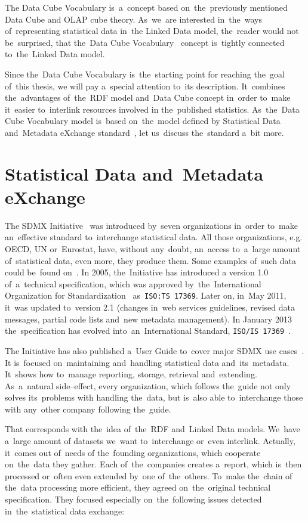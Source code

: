 The Data Cube Vocabulary is~a~concept based on~the~previously mentioned Data Cube and
OLAP cube theory. As~we~are interested in~the~ways of~representing statistical data in~the
Linked Data model, the~reader would not be~surprised, that the~Data Cube 
Vocabulary~\cite{dcv}
concept is~tightly connected to~the~Linked Data model.

Since the~Data Cube Vocabulary is~the~starting point for reaching the~goal of~this thesis,
we will pay a~special attention to~its description. It~combines the~advantages of~the~RDF
model and~Data Cube concept in~order to~make it~easier to~interlink resources involved
in the~published statistics. As~the~Data Cube Vocabulary model is~based on~the~model defined
by Statistical Data and~Metadata eXchange standard~\cite{sdmx}, let us~discuss the~standard a~bit more.

\section{Statistical Data and~Metadata eXchange}
The SDMX Initiative~\cite{sdmx} was introduced by~seven organizations in~order to~make
an~effective standard to~interchange statistical data. All those organizations, e.g. OECD,
UN or~Eurostat, have, without any~doubt, an~access to~a~large amount of~statistical data, even more,
they produce them. Some examples of~such data could be~found on~\cite{pubdata}.
In 2005, the~Initiative has introduced a
version 1.0 of~a~technical specification, which was approved by~the~International
Organization for Standardization~\cite{iso} as~\texttt{ISO:TS 17369}.
Later on, in~May 2011, it~was updated to~version 2.1 (changes in~web services guidelines,
revised data messages, partial code lists and~new metadata management).
In January 2013 the~specification has evolved into~an~International Standard,
\texttt{ISO/IS 17369}~\cite{isosdmx}.

The Initiative has also published a~User Guide to~cover major SDMX use cases~\cite{sdmxuserguide}.
It is~focused on~maintaining and~handling statistical data and~its~metadata. It~shows
how to~manage reporting, storage, retrieval and~extending. As~a~natural side--effect,
every organization, which follows the~guide not only solves its~problems with
handling the~data, but is~also able to~interchange those with any~other company
following the~guide.

That corresponds with the~idea of~the~RDF and~Linked Data models. We~have a~large amount
of datasets we~want to~interchange or~even interlink. Actually, it~comes out of~needs
of the~founding organizations, which cooperate on~the~data they gather. Each of~the~companies creates
a~report, which is~then processed or~often even extended by~one of~the~others. To~make the~chain
of the~data processing more efficient, they agreed on~the~original technical specification.
They focused especially on~the~following issues detected in~the~statistical data exchange:

